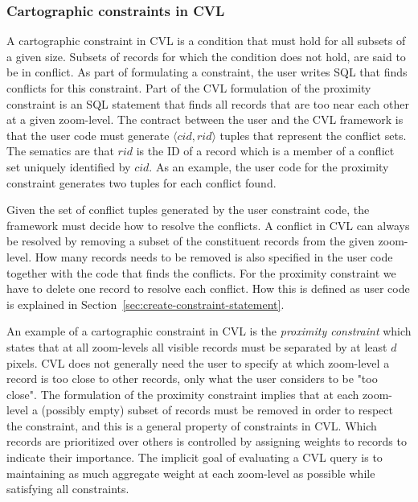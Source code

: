 

\subsubsection{Cartographic constraints in CVL}
\label{sec:cartographic-constraints-in-cvl}
A cartographic constraint in CVL is a condition that must hold for all subsets of a given size. Subsets of records for which the condition does not hold, are said to be in conflict. As part of formulating a constraint, the user writes SQL that finds conflicts for this constraint. Part of the CVL formulation of the proximity constraint is an SQL statement that finds all records that are too near each other at a given zoom-level. The contract between the user and the CVL framework is that the user code must generate $\langle cid, rid \rangle$ tuples that represent the conflict sets. The sematics are that $rid$ is the ID of a record which is a member of a conflict set uniquely identified by $cid$. As an example, the user code for the proximity constraint generates two tuples for each conflict found.

Given the set of conflict tuples generated by the user constraint code, the framework must decide how to resolve the conflicts. A conflict in CVL can always be resolved by removing a subset of the constituent records from the given zoom-level. How many records needs to be removed is also specified in the user code together with the code that finds the conflicts. For the proximity constraint we have to delete one record to resolve each conflict. How this is defined as user code is explained in Section~\ref{sec:create-constraint-statement}.

An example of a cartographic constraint in CVL is the \emph{proximity constraint} which states that at all zoom-levels all visible records must be separated by at least $d$ pixels. CVL does not generally need the user to specify at which zoom-level a record is too close to other records, only what the user considers to be "too close". The formulation of the proximity constraint implies that at each zoom-level a (possibly empty) subset of records must be removed in order to respect the constraint, and this is a general property of constraints in CVL. Which records are prioritized over others is controlled by assigning weights to records to indicate their importance. The implicit goal of evaluating a CVL query is to maintaining as much aggregate weight at each zoom-level as possible while satisfying all constraints.

